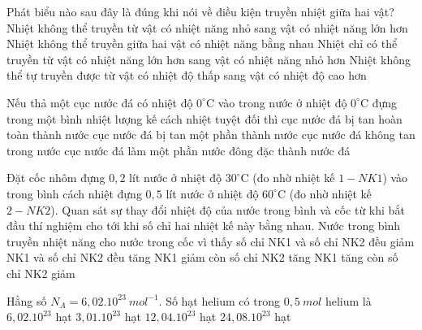 \begin{ex}%
	Phát biểu nào sau đây là đúng khi nói về điều kiện truyền nhiệt giữa hai vật?
	\choice
	{Nhiệt không thể truyền từ vật có nhiệt năng nhỏ sang vật có nhiệt năng lớn hơn}
	{Nhiệt không thể truyền giữa hai vật có nhiệt năng bằng nhau}
	{Nhiệt chỉ có thể truyền từ vật có nhiệt năng lớn hơn sang vật có nhiệt năng nhỏ hơn}
	{\True Nhiệt không thể tự truyền được từ vật có nhiệt độ thấp sang vật có nhiệt độ cao hơn}
	\loigiai{
	}
\end{ex}

\begin{ex}%
	Nếu thả một cục nước đá có nhiệt độ $0^\circ\text{C}$ vào trong nước ở nhiệt độ $0^\circ\text{C}$ đựng trong một bình nhiệt lượng kế cách nhiệt tuyệt đối thì
	\choice
	{cục nước đá bị tan hoàn toàn thành nước}
	{cục nước đá bị tan một phần thành nước}
	{\True cục nước đá không tan trong nước}
	{cục nước đá làm một phần nước đông đặc thành nước đá}
\end{ex}

\begin{ex}%
	Đặt cốc nhôm đựng $0,2$ lít nước ở nhiệt độ $30^\circ\text{C}$ (đo nhờ nhiệt kế $1-NK1$) vào trong bình cách nhiệt đựng $0,5$ lít nước ở nhiệt độ $60^\circ\text{C}$ (đo nhờ nhiệt kế $2-NK2$). Quan sát sự thay đổi nhiệt độ của nước trong bình và cốc từ khi bắt đầu thí nghiệm cho tới khi số chỉ hai nhiệt kế này bằng nhau. Nước trong bình truyền nhiệt năng cho nước trong cốc vì thấy số chỉ
	\choice
	{NK1 và số chỉ NK2 đều giảm}
	{NK1 và số chỉ NK2 đều tăng}
	{NK1 giảm còn số chỉ NK2 tăng}
	{\True NK1 tăng còn số chỉ NK2 giảm}
\end{ex}

\begin{ex}%
	Hằng số $N_A=6,02.10^{23}\ mol^{-1}$. Số hạt helium có trong $0,5\ mol$ helium là
	\choice
	{$6,02.10^{23}$ hạt}
	{\True $3,01.10^{23}$ hạt}
	{$12,04.10^{23}$ hạt}
	{$24,08.10^{23}$ hạt}
\end{ex}

